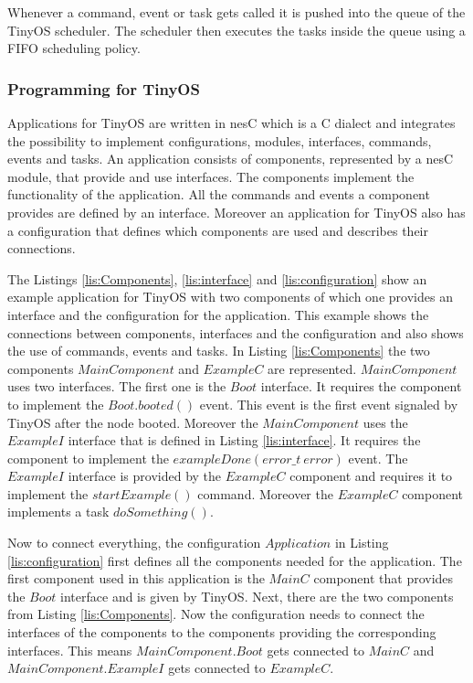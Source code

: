 Whenever a command, event or task gets called it is pushed into the queue of the TinyOS scheduler. The scheduler then executes the tasks inside the queue using a FIFO scheduling policy. \cite{Tinyos}     

\subsubsection{Programming for TinyOS}
Applications for TinyOS are written in nesC which is a C dialect and integrates the possibility to implement configurations, modules, interfaces, commands, events and tasks. An application consists of components, represented by a nesC module, that provide and use interfaces. The components implement the functionality of the application. All the commands and events a component provides are defined by an interface. Moreover an application for TinyOS also has a configuration that defines which components are used and describes their connections.   

The Listings \ref{lis:Components}, \ref{lis:interface} and \ref{lis:configuration} show an example application for TinyOS with two components of which one provides an interface and the configuration for the application. This example shows the connections between components, interfaces and the configuration and also shows the use of commands, events and tasks. In Listing \ref{lis:Components} the two components $MainComponent$ and $ExampleC$ are represented. $MainComponent$ uses two interfaces. The first one is the $Boot$ interface. It requires the component to implement the $Boot.booted()$ event. This event is the first event signaled by TinyOS after the node booted. Moreover the $MainComponent$ uses the $ExampleI$ interface that is defined in Listing \ref{lis:interface}. It requires the component to implement the $exampleDone(error\_t\ error)$ event. The $ExampleI$ interface is provided by the $ExampleC$ component and requires it to implement the $startExample()$ command. Moreover the $ExampleC$ component implements a task $doSomething()$.

Now to connect everything, the configuration $Application$ in Listing \ref{lis:configuration} first defines all the components needed for the application. The first component used in this application is the $MainC$ component that provides the $Boot$ interface and is given by TinyOS. Next, there are the two components from Listing \ref{lis:Components}. Now the configuration needs to connect the interfaces of the components to the components providing the corresponding interfaces. This means $MainComponent.Boot$ gets connected to $MainC$ and $MainComponent.ExampleI$ gets connected to $ExampleC$.

